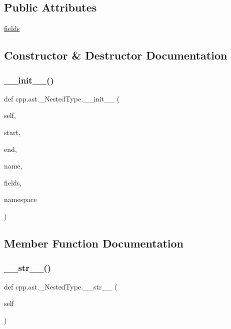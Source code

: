 \subsection*{Public Attributes}
\begin{DoxyCompactItemize}
\item 
\mbox{\hyperlink{classcpp_1_1ast_1_1___nested_type_aed69c37a409b4d26e6cfde2de3185d86}{fields}}
\end{DoxyCompactItemize}


\subsection{Constructor \& Destructor Documentation}
\mbox{\label{classcpp_1_1ast_1_1___nested_type_a63acff60f38885be6cc11231fffc3f4e}} 
\subsubsection{\texorpdfstring{\_\_init\_\_()}{\_\_init\_\_()}}
{\footnotesize\ttfamily def cpp.\+ast.\+\_\+\+Nested\+Type.\+\_\+\+\_\+init\+\_\+\+\_\+ (\begin{DoxyParamCaption}\item[{}]{self,  }\item[{}]{start,  }\item[{}]{end,  }\item[{}]{name,  }\item[{}]{fields,  }\item[{}]{namespace }\end{DoxyParamCaption})}



\subsection{Member Function Documentation}
\mbox{\label{classcpp_1_1ast_1_1___nested_type_a18901ec6acba88c526d703444bf4d52c}} 
\subsubsection{\texorpdfstring{\_\_str\_\_()}{\_\_str\_\_()}}
{\footnotesize\ttfamily def cpp.\+ast.\+\_\+\+Nested\+Type.\+\_\+\+\_\+str\+\_\+\+\_\+ (\begin{DoxyParamCaption}\item[{}]{self }\end{DoxyParamCaption})}

